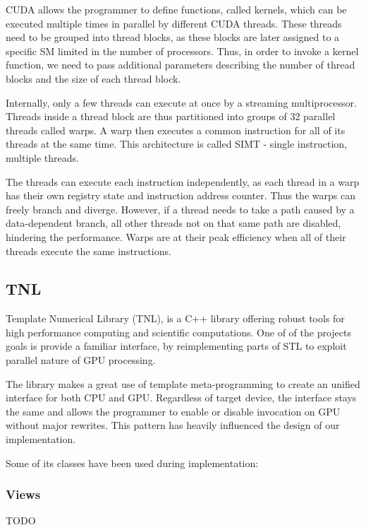 \documentclass{article}
\begin{document}
CUDA allows the programmer to define functions, called kernels, which can be executed multiple times in parallel by different CUDA threads. These threads need to be grouped into thread blocks, as these blocks are later assigned to a specific SM limited in the number of processors. Thus, in order to invoke a kernel function, we need to pass additional parameters describing the number of thread blocks and the size of each thread block.

Internally, only a few threads can execute at once by a streaming multiprocessor. Threads inside a thread block are thus partitioned into groups of 32 parallel threads called warps. A warp then executes a common instruction for all of its threads at the same time. This architecture is called SIMT - single instruction, multiple threads.

The threads can execute each instruction independently, as each thread in a warp has their own registry state and instruction address counter. Thus the warps can freely branch and diverge. However, if a thread needs to take a path caused by a data-dependent branch, all other threads not on that same path are disabled, hindering the performance. Warps are at their peak efficiency when all of their threads execute the same instructions.

\subsection{TNL}

Template Numerical Library (TNL), is a C++ library offering robust tools for high performance computing and scientific computations. One of of the projects goals is provide a familiar interface, by reimplementing parts of STL to exploit parallel nature of GPU processing.

The library makes a great use of template meta-programming to create an unified interface for both CPU and GPU. Regardless of target device, the interface stays the same and allows the programmer to enable or disable invocation on GPU without major rewrites. This pattern has heavily influenced the design of our implementation.

Some of its classes have been used during implementation:

\subsubsection{Views}

TODO
\end{document}
